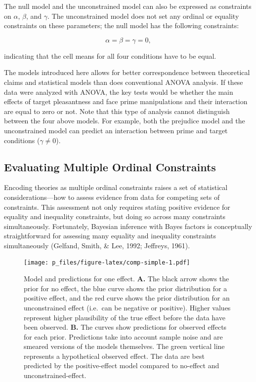 \documentclass[english,,man]{apa6}
\begin{document}
The null model and the unconstrained model can also be expressed as constraints on \(\alpha\), \(\beta\), and \(\gamma\). The unconstrained model does not set any ordinal or equality constraints on these parameters; the null model has the following constraints:

\[\alpha = \beta = \gamma = 0,\]

indicating that the cell means for all four conditions have to be equal.

The models introduced here allows for better correspondence between theoretical claims and statistical models than does conventional ANOVA analysis. If these data were analyzed with ANOVA, the key tests would be whether the main effects of target pleasantness and face prime manipulations and their interaction are equal to zero or not. Note that this type of analysis cannot distinguish between the four above models. For example, both the prejudice model and the unconstrained model can predict an interaction between prime and target conditions (\(\gamma \neq 0\)).

\hypertarget{evaluating-multiple-ordinal-constraints}{%
\subsection{Evaluating Multiple Ordinal Constraints}\label{evaluating-multiple-ordinal-constraints}}

Encoding theories as multiple ordinal constraints raises a set of statistical considerations---how to assess evidence from data for competing sets of constraints. This assessment not only requires stating positive evidence for equality and inequality constraints, but doing so across many constraints simultaneously. Fortunately, Bayesian inference with Bayes factors is conceptually straightforward for assessing many equality and inequality constraints simultaneously (Gelfand, Smith, \& Lee, 1992; Jeffreys, 1961).

\begin{figure}
\centering
\texttt{[image: p\_files/figure-latex/comp-simple-1.pdf]}
\caption{\label{fig:comp-simple}Model and predictions for one effect. \textbf{A.} The black arrow shows the prior for no effect, the blue curve shows the prior distribution for a positive effect, and the red curve shows the prior distribution for an unconstrained effect (i.e.~can be negative or positive). Higher values represent higher plausibility of the true effect before the data have been observed. \textbf{B.} The curves show predictions for observed effects for each prior. Predictions take into account sample noise and are smeared versions of the models themselves. The green vertical line represents a hypothetical observed effect. The data are best predicted by the positive-effect model compared to no-effect and unconstrained-effect.}
\end{figure}
\end{document}
